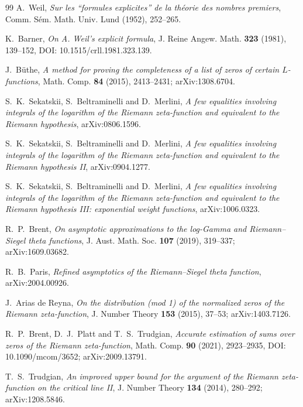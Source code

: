 \documentclass[11pt]{article}
\theoremstyle{definition}
\theoremstyle{remark}
\begin{document}
\begin{thebibliography}{99}
A.~Weil,
\emph{Sur les ``formules explicites'' de la théorie des nombres premiers},
Comm. Sém. Math. Univ. Lund (1952), 252--265.

K.~Barner,
\emph{On A. Weil's explicit formula},
J. Reine Angew. Math. \textbf{323} (1981), 139--152,
DOI: 10.1515/crll.1981.323.139.

J.~Büthe,
\emph{A method for proving the completeness of a list of zeros of certain $L$-functions},
Math. Comp. \textbf{84} (2015), 2413--2431; arXiv:1308.6704.

S.~K.~Sekatskii, S.~Beltraminelli and D.~Merlini,
\emph{A few equalities involving integrals of the logarithm of the Riemann zeta-function and equivalent to the Riemann hypothesis},
arXiv:0806.1596.

S.~K.~Sekatskii, S.~Beltraminelli and D.~Merlini,
\emph{A few equalities involving integrals of the logarithm of the Riemann zeta-function and equivalent to the Riemann hypothesis II},
arXiv:0904.1277.

S.~K.~Sekatskii, S.~Beltraminelli and D.~Merlini,
\emph{A few equalities involving integrals of the logarithm of the Riemann zeta-function and equivalent to the Riemann hypothesis III: exponential weight functions},
arXiv:1006.0323.

R.~P.~Brent,
\emph{On asymptotic approximations to the log-Gamma and Riemann--Siegel theta functions},
J. Aust. Math. Soc. \textbf{107} (2019), 319--337;
arXiv:1609.03682.

R.~B.~Paris,
\emph{Refined asymptotics of the Riemann--Siegel theta function},
arXiv:2004.00926.

J.~Arias de Reyna,
\emph{On the distribution (mod 1) of the normalized zeros of the Riemann zeta-function},
J. Number Theory \textbf{153} (2015), 37--53; arXiv:1403.7126.

R.~P.~Brent, D.~J.~Platt and T.~S.~Trudgian,
\emph{Accurate estimation of sums over zeros of the Riemann zeta-function},
Math. Comp. \textbf{90} (2021), 2923--2935, DOI: 10.1090/mcom/3652; arXiv:2009.13791.

T.~S.~Trudgian,
\emph{An improved upper bound for the argument of the Riemann zeta-function on the critical line II},
J. Number Theory \textbf{134} (2014), 280--292; arXiv:1208.5846.

\end{thebibliography}
\end{document}
